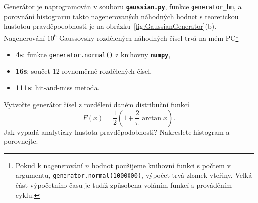 \documentclass[a4paper,11pt,twoside]{article}
\def\code#1{\textnormal{\texttt{#1}}}
\def\file#1{\textnormal{\textbf{\texttt{#1}}}}
\def\ghfile#1#2{\textnormal{\textbf{\texttt{\href{https://github.com/PavelStransky/PCInPhysics/blob/main/#1#2}{#2}}}}}
\theoremstyle{red}
\theoremstyle{green}
\begin{document}
    \begin{solution}
        Generátor je naprogramován v souboru \ghfile{python/histogram/}{gaussian.py}, funkce \code{generator_hm}, a porovnání histogramu takto nagenerovaných náhodných hodnot s teoretickou hustotou pravděpodobnosti je na obrázku~\ref{fig:GaussianGenerator}(b). 
        Nagenerování $10^6$ Gaussovsky rozdělených náhodných čísel trvá na mém PC\footnote{
            Pokud k nagenerování $n$ hodnot použijeme knihovní funkci s počtem v argumentu, \code{generator.normal(1000000)}, výpočet trvá zlomek vteřiny.
            Velká část výpočetního času je tudíž způsobena voláním funkcí a prováděním cyklu. 
        }
        \begin{itemize}
            \item {\bf 4s}: funkce \code{generator.normal()} z knihovny \file{numpy},
            \item {\bf 16s}: součet 12 rovnoměrně rozdělených čísel,
            \item {\bf 111s}: hit-and-miss metoda.
        \end{itemize}
    \end{solution}

    \begin{solved}
        Vytvořte generátor čísel z rozdělení daném distribuční funkcí
        \begin{equation}
            \label{eq:F}
            F(x)=\frac{1}{2}\left(1+\frac{2}{\pi}\arctan{x}\right).
        \end{equation}
        Jak vypadá analyticky hustota pravděpodobnosti?
        Nakreslete histogram a porovnejte.
    \end{solved}
\end{document}
